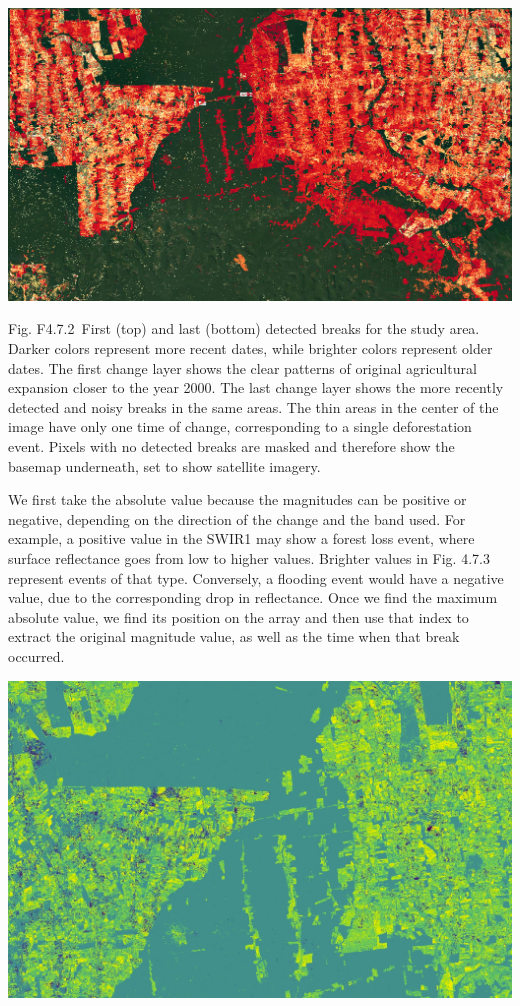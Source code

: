 \documentclass[
  letterpaper,
  DIV=11,
  numbers=noendperiod]{scrreprt}
\begin{document}
\includegraphics{./F4/image1.png}

Fig. F4.7.2~First (top) and last (bottom) detected breaks for the study
area. Darker colors represent more recent dates, while brighter colors
represent older dates. The first change layer shows the clear patterns
of original agricultural expansion closer to the year 2000. The last
change layer shows the more recently detected and noisy breaks in the
same areas. The thin areas in the center of the image have only one time
of change, corresponding to a single deforestation event. Pixels with no
detected breaks are masked and therefore show the basemap underneath,
set to show satellite imagery.

We first take the absolute value because the magnitudes can be positive
or negative, depending on the direction of the change and the band used.
For example, a positive value in the SWIR1 may show a forest loss event,
where surface reflectance goes from low to higher values. Brighter
values in Fig. 4.7.3 represent events of that type. Conversely, a
flooding event would have a negative value, due to the corresponding
drop in reflectance. Once we find the maximum absolute value, we find
its position on the array and then use that index to extract the
original magnitude value, as well as the time when that break occurred.

\includegraphics{./F4/image44.png}
\end{document}
